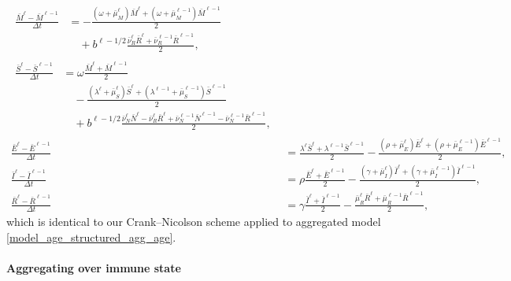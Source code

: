 \documentclass[USenglish]{article}
\begin{document}
\begin{subequations}
  \label{numerics_age_structured_agg_age}
  \begin{align}
    \begin{split}
      \frac{\bar{M}^{\ell} - \bar{M}^{\ell - 1}}{\Delta t}
      &= - \frac{(\omega + \bar{\mu}_M^{\ell}) \bar{M}^{\ell}
        + (\omega + \bar{\mu}_M^{\ell - 1}) \bar{M}^{\ell - 1}}{2}
      \\ & \quad {}
      + b^{\ell - 1 / 2}
      \frac{\bar{\nu}_R^{\ell} \bar{R}^{\ell}
        + \bar{\nu}_R^{\ell - 1} \bar{R}^{\ell - 1}}{2},
    \end{split}
    \\
    \begin{split}
      \frac{\bar{S}^{\ell} - \bar{S}^{\ell - 1}}{\Delta t}
      &= \omega \frac{\bar{M}^{\ell} + \bar{M}^{\ell - 1}}{2}
      \\ & \quad {}
      - \frac{(\lambda^{\ell} + \bar{\mu}_S^{\ell}) \bar{S}^{\ell}
        + (\lambda^{\ell - 1} + \bar{\mu}_S^{\ell - 1}) \bar{S}^{\ell - 1}}{2}
      \\ & \quad {}
      + b^{\ell - 1 / 2}
      \frac{\bar{\nu}_N^{\ell} \bar{N}^{\ell}
        - \bar{\nu}_R^{\ell} \bar{R}^{\ell}
        + \bar{\nu}_N^{\ell - 1} \bar{N}^{\ell - 1}
        - \bar{\nu}_N^{\ell - 1} \bar{R}^{\ell - 1}}{2},
    \end{split}
    \\
    \frac{\bar{E}^{\ell} - \bar{E}^{\ell - 1}}{\Delta t}
    &= \frac{\lambda^{\ell} \bar{S}^{\ell}
      + \lambda^{\ell - 1} \bar{S}^{\ell - 1}}{2}
    - \frac{(\rho + \bar{\mu}_E^{\ell}) \bar{E}^{\ell}
      + (\rho + \bar{\mu}_E^{\ell - 1}) \bar{E}^{\ell - 1}}{2},
    \\
    \frac{\bar{I}^{\ell} - \bar{I}^{\ell - 1}}{\Delta t}
    &= \rho \frac{\bar{E}^{\ell} + \bar{E}^{\ell - 1}}{2}
    - \frac{(\gamma + \bar{\mu}_I^{\ell}) \bar{I}^{\ell}
      + (\gamma + \bar{\mu}_I^{\ell - 1}) \bar{I}^{\ell - 1}}{2},
    \\
    \frac{\bar{R}^{\ell} - \bar{R}^{\ell - 1}}{\Delta t}
    &= \gamma \frac{\bar{I}^{\ell} + \bar{I}^{\ell - 1}}{2}
    - \frac{\bar{\mu}_R^{\ell} \bar{R}^{\ell}
      + \bar{\mu}_R^{\ell - 1} \bar{R}^{\ell - 1}}{2},
  \end{align}
\end{subequations}
which is identical to our Crank--Nicolson scheme applied to aggregated
model \eqref{model_age_structured_agg_age}.


\paragraph{Aggregating over immune state}
\end{document}
